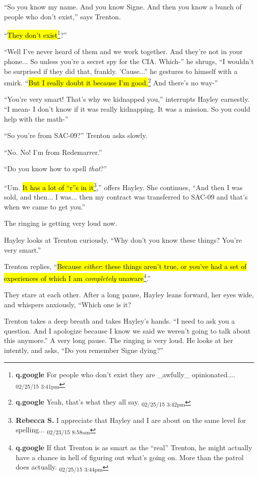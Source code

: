 ``So you know my name.  And you know Signe.  And then you know a bunch of people who don't exist,'' says Trenton.

``\hl{They don't exist}\footnote{\textbf{q.google }For people who don't exist they are \_awfully\_ opinionated.... \textsubscript{02/25/15 3:41pm}}?''

``Well I've never heard of them and we work together.  And they're not in your phone...  So unless you're a secret spy for the CIA.  Which-'' he shrugs, ``I wouldn't be surprised if they did that, frankly.  'Cause...'' he gestures to himself with a smirk.  ``\hl{But I really doubt it because I'm good.}\footnote{\textbf{q.google }Yeah, that's what they all say. \textsubscript{02/25/15 3:42pm}}  And there's no way-''

``You're very smart!  That's why we kidnapped you,'' interrupts Hayley earnestly.  ``I mean- I don't know if it was really kidnapping.  It was a mission.  So you could help with the math-''

``So you're from SAC-09?'' Trenton asks slowly.

``No.  No!  I'm from Redemarrer.'' 

``Do you know how to spell \textit{that}?''

``Um.  \hl{It has a lot of ``r''s in it}\footnote{\textbf{Rebecca S. }I appreciate that Hayley and I are about on the same level for spelling... \textsubscript{02/23/15 8:58am}},'' offers Hayley.  She continues, ``And then I was sold, and then... I was...  then my contract was transferred to SAC-09 and that's when we came to get you.''

The ringing is getting very loud now.

Hayley looks at Trenton curiously, ``Why don't you know these things?  You're very smart.''

Trenton replies, ``\hl{Because \textit{either}: these things aren't true, or you've had a set of experiences of which I am \textit{completely} unaware}\footnote{\textbf{q.google }If that Trenton is as smart as the ``real'' Trenton, he might actually have a chance in hell of figuring out what's going on. More than the patrol does actually. \textsubscript{02/25/15 3:44pm}}.''

They stare at each other.  After a long pause, Hayley leans forward, her eyes wide, and whispers anxiously, ``Which one is it?

Trenton takes a deep breath and takes Hayley's hands.  ``I need to ask you a question.  And I apologize because I know we said we weren't going to talk about this anymore.''  A very long pause.  The ringing is very loud.  He looks at her intently, and asks, ``Do you remember Signe dying?''



